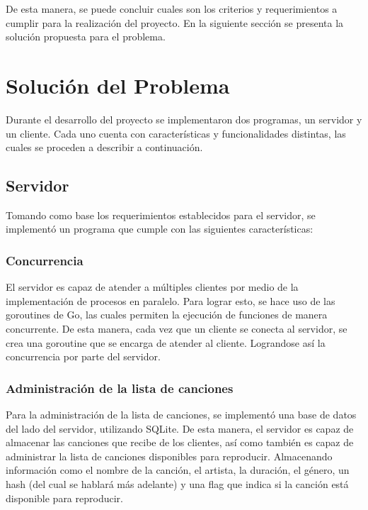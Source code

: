 De esta manera, se puede concluir cuales son los criterios y requerimientos
a cumplir para la realización del proyecto. En la siguiente sección se
presenta la solución propuesta para el problema.

\section{Solución del Problema}

Durante el desarrollo del proyecto se implementaron dos programas, un servidor
y un cliente. Cada uno cuenta con características y funcionalidades distintas,
las cuales se proceden a describir a continuación.

\subsection{Servidor}

Tomando como base los requerimientos establecidos para el servidor, se
implementó un programa que cumple con las siguientes características:

\subsubsection{Concurrencia}

El servidor es capaz de atender a múltiples clientes por medio de la
implementación de procesos en paralelo. Para lograr esto, se hace uso de las 
goroutines de Go, las cuales permiten la ejecución de funciones de manera
concurrente. De esta manera, cada vez que un cliente se conecta al servidor,
se crea una goroutine que se encarga de atender al cliente. Lograndose así
la concurrencia por parte del servidor.

\subsubsection{Administración de la lista de canciones}

Para la administración de la lista de canciones, se implementó una base de 
datos del lado del servidor, utilizando SQLite. De esta manera, el servidor
es capaz de almacenar las canciones que recibe de los clientes, así como
también es capaz de administrar la lista de canciones disponibles para
reproducir. Almacenando información como el nombre de la canción, el artista,
la duración, el género, un hash (del cual se hablará más adelante) y una flag 
que indica si la canción está disponible para reproducir.

